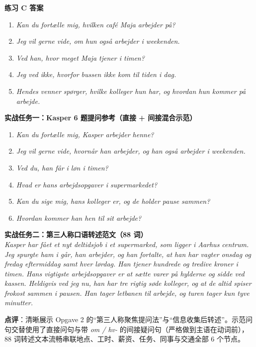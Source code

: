 \begin{answerbox}
\textbf{练习 C 答案}
\begin{enumerate}
  \item \textit{Kan du fortælle mig, hvilken café Maja arbejder på?}
  \item \textit{Jeg vil gerne vide, om hun også arbejder i weekenden.}
  \item \textit{Ved han, hvor meget Maja tjener i timen?}
  \item \textit{Jeg ved ikke, hvorfor bussen ikke kom til tiden i dag.}
  \item \textit{Hendes venner spørger, hvilke kolleger hun har, og hvordan hun kommer på arbejde.}
\end{enumerate}

\textbf{实战任务一：Kasper 6 题提问参考（直接 + 间接混合示范）}
\begin{enumerate}
  \item \textit{Kan du fortælle mig,  Kasper arbejder henne?}
  \item \textit{Jeg vil gerne vide, hvornår han arbejder, og  han også arbejder i weekenden.}
  \item \textit{Ved du,  han får i løn i timen?}
  \item \textit{Hvad er hans arbejdsopgaver i supermarkedet?}
  \item \textit{Kan du sige mig,  hans kolleger er, og  de holder pause sammen?}
  \item \textit{Hvordan kommer han hen til sit arbejde?}
\end{enumerate}

\textbf{实战任务二：第三人称口语转述范文（88 词）}\\
\textit{Kasper har fået et nyt deltidsjob i et supermarked, som ligger i Aarhus centrum. Jeg spurgte ham i går,  han arbejder, og han fortalte, at han har vagter onsdag og fredag eftermiddag samt hver lørdag. Han tjener hundrede og tredive kroner i timen. Hans vigtigste arbejdsopgaver er at sætte varer på hylderne og sidde ved kassen. Heldigvis ved jeg nu,  han har tre rigtig søde kolleger, og at de altid spiser frokost sammen i pausen. Han tager letbanen til arbejde, og turen tager kun tyve minutter.}

\small\textbf{点评}：清晰展示 Opgave 2 的“第三人称聚焦提问法”与“信息收集后转述”。示范问句交替使用了直接问句与带 \textit{om / hv-} 的间接疑问句（严格做到主语在动词前），88 词转述文本流畅串联地点、工时、薪资、任务、同事与交通全部 6 个节点。
\end{answerbox}
